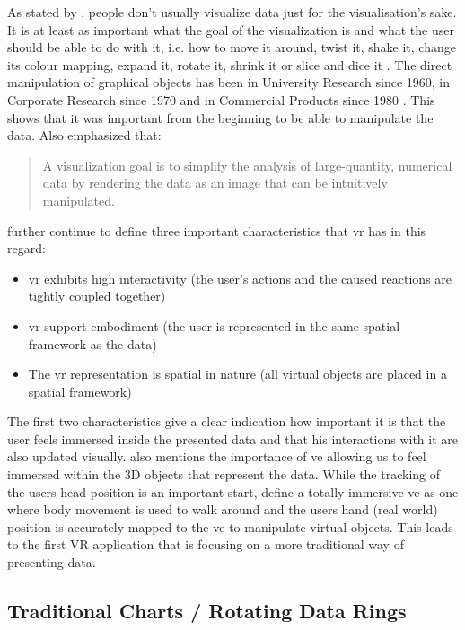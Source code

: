 As stated by \cite{Stone1994}, people don't usually visualize data just for the visualisation's sake. It is at least as important what the goal of the visualization is and what the user should be able to do with it, i.e. how to move it around, twist it, shake it, change its colour mapping, expand it, rotate it, shrink it or slice and dice it \citep{Stone1994}. The direct manipulation of graphical objects has been in University Research since 1960, in Corporate Research since 1970 and in Commercial Products since 1980 \citep{Myers1998}. This shows that it was important from the beginning to be able to manipulate the data. Also \citet[p.410]{Stone1994} emphasized that: \blockquote{A visualization goal is to simplify the analysis of large-quantity, numerical data by rendering the data as an image that can be intuitively manipulated.} \cite{Stone1994} further continue to define three important characteristics that \gls{vr} has in this regard:
\begin{itemize}[noitemsep,nolistsep]
	\item \gls{vr} exhibits high interactivity (the user's actions and the caused reactions are tightly coupled together)
	\item \gls{vr} support embodiment (the user is represented  in the same spatial framework as the data)
	\item The \gls{vr} representation is spatial in nature (all virtual objects are placed in a spatial framework)
\end{itemize}
The first two characteristics give a clear indication how important it is that the user feels immersed inside the presented data and that his interactions with it are also updated visually. \cite{Jamieson2007} also mentions the importance of \gls{ve} allowing us to feel immersed within the 3D objects that represent the data. While the tracking of the users head position is an important start, \cite{Jamieson2007} define a totally immersive \gls{ve} as one where body movement is used to walk around and the users hand (real world) position is accurately mapped to the \gls{ve} to manipulate virtual objects. \newline
This leads to the first VR application that is focusing on a more traditional way of presenting data.


\subsection{Traditional Charts / Rotating Data Rings}

